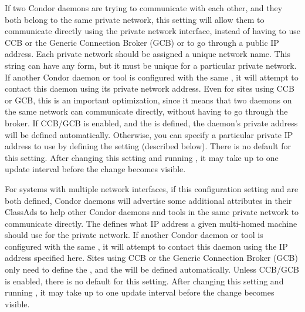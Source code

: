 \begin{description}
\label{param:PrivateNetworkName}
\item[\Macro{PRIVATE\_NETWORK\_NAME}]
  If two Condor daemons are trying to communicate with each other, and
  they both belong to the same private network, this setting will
  allow them to communicate directly using the private network
  interface, instead of having to use CCB or the Generic Connection Broker
  (GCB) or to go through a public IP address.
  Each private network should be assigned a unique network name.
  This string can have any form, but it must be unique for a
  particular private network.
  If another Condor daemon or tool is configured with the same
  , it will attempt to contact this
  daemon using its private network address.
  Even for sites using CCB or GCB, this is an important optimization, since
  it means that two daemons on the same network can communicate
  directly, without having to go through the broker.
  If CCB/GCB is enabled, and the  is
  defined, the daemon's private address will be defined automatically.
  Otherwise, you can specify a particular private IP address to use by
  defining the  setting
  (described below).
  There is no default for this setting.
  After changing this setting and running , it may
  take up to one  update interval before the change becomes visible.

\label{param:PrivateNetworkInterface}
\item[\Macro{PRIVATE\_NETWORK\_INTERFACE}]
  For systems with multiple network interfaces, if this configuration
  setting and  are both defined,
  Condor daemons will advertise some additional attributes in their
  ClassAds to help other Condor daemons and tools in the same private
  network to communicate directly.
  The  defines what IP address a
  given multi-homed machine should use for the private network.
  If another Condor daemon or tool is configured with the same
  , it will attempt to contact this
  daemon using the IP address specified here.
  Sites using CCB or the Generic Connection Broker (GCB) only need to define
  the , and the 
   will be defined automatically.
  Unless CCB/GCB is enabled, there is no default for this setting.
  After changing this setting and running , it may
  take up to one  update interval before the change becomes visible.


\end{description}
